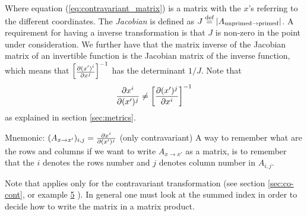 \documentclass[a4paper, 12pt]{article}
\begin{document}
%
Where equation (\ref{eq:contravariant_matrix}) is a matrix with the $x$'s
referring to the different coordinates. The \emph{Jacobian} is
defined as $J\overset{\text{def}}{=}|A_{\text{unprimed}\to \text{primed}}|$. A requirement for
having a inverse transformation is that $J$ is non-zero in the point under
consideration. We further have that the matrix inverse of the Jacobian matrix
of an invertible function is the Jacobian matrix of the inverse function, which
means that
%
$\begin{bmatrix}
 \frac{\partial {(x')^i}}{\partial{x^j}}
\end{bmatrix}^{-1}$
has the determinant $1/J$. Note that
%
\begin{align*}
 \frac{\partial {x^i}}{\partial{(x')^j}} \neq \left[\frac{\partial {(x')^j}}{\partial{x^i}}\right]^{-1}
\end{align*}
%
as explained in section \ref{sec:metrics}.

\vspace{0.5cm}
\begin{greenbox}{Mnemonic: $(A_{x \to x'})_{i,j} = \frac{\partial {x^i}}{\partial{(x')^j}}$ (only
contravariant)}
 A way to remember what are the rows and columns if we want to write $A_{x \to
 x'}$ as a matrix, is to remember that the $i$ denotes the rows number and
 $j$ denotes column number in $A_{i,j}$.

 Note that applies only for the contravariant transformation (see section
\ref{sec:co-cont}, or example \hyperref[ex:fmt]{5} ). In general one must look
at the summed index in order to decide how to write the matrix in a matrix
product.
\end{greenbox}
\end{document}
